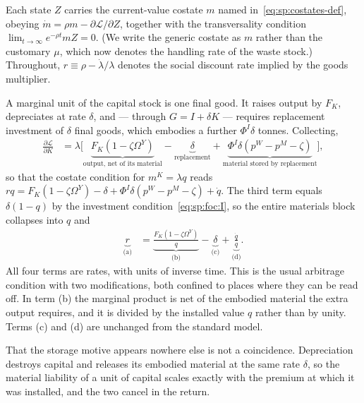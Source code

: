 Each state $Z$ carries the current-value costate $m$ named in~\eqref{eq:sp:costates-def}, obeying $\dot m=\rho m-\partial\mathcal L/\partial Z$, together with the transversality condition $\lim_{t\to\infty}e^{-\rho t}m Z=0$. (We write the generic costate as $m$ rather than the customary $\mu$, which now denotes the handling rate of the waste stock.) Throughout, $r\equiv\rho-\dot\lambda/\lambda$ denotes the social discount rate implied by the goods multiplier.

 A marginal unit of the capital stock is one final good. It raises output by $F_K$, depreciates at rate $\delta$, and --- through $G=I+\delta K$ --- requires replacement investment of $\delta$ final goods, which embodies a further $\Phi^I\delta$ tonnes. Collecting,
\begin{align*}
\frac{\partial\mathcal L}{\partial K} &= \lambda\Big[\underbrace{F_K\left(1-\zeta\Omega^Y\right)}_{\text{output, net of its material}}-\underbrace{\delta}_{\text{replacement}}+\underbrace{\Phi^I\delta\left(p^W-p^M-\zeta\right)}_{\text{material stored by replacement}}\Big],
\end{align*}
so that the costate condition for $m^K=\lambda q$ reads $rq=F_K\left(1-\zeta\Omega^Y\right)-\delta+\Phi^I\delta\left(p^W-p^M-\zeta\right)+\dot q$. The third term equals $\delta\left(1-q\right)$ by the investment condition~\eqref{eq:sp:foc:I}, so the entire materials block collapses into $q$ and
\begin{align}
\underbrace{r}_{\text{(a)}} &= \underbrace{\frac{F_K\left(1-\zeta\Omega^Y\right)}{q}}_{\text{(b)}}-\underbrace{\delta}_{\text{(c)}}+\underbrace{\frac{\dot q}{q}}_{\text{(d)}} .
\label{eq:sp:costate:K}
\end{align}
All four terms are rates, with units of inverse time. This is the usual arbitrage condition with two modifications, both confined to places where they can be read off. In term (b) the marginal product is net of the embodied material the extra output requires, and it is divided by the installed value $q$ rather than by unity. Terms (c) and (d) are unchanged from the standard model.

That the storage motive appears nowhere else is not a coincidence. Depreciation destroys capital and releases its embodied material at the same rate $\delta$, so the material liability of a unit of capital scales exactly with the premium at which it was installed, and the two cancel in the return.

